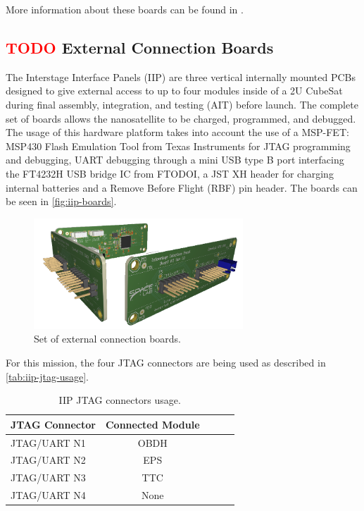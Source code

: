 More information about these boards can be found in \cite{pc104-boards}.

\subsection{ \textcolor{red}{TODO} External Connection Boards}

The Interstage Interface Panels (IIP) are three vertical internally mounted PCBs designed to give external access to up to four modules inside of a 2U CubeSat during final assembly, integration, and testing (AIT) before launch. The complete set of boards allows the nanosatellite to be charged, programmed, and debugged. The usage of this hardware platform takes into account the use of a MSP-FET: MSP430 Flash Emulation Tool from Texas Instruments for JTAG programming and debugging, UART debugging through a mini USB type B port interfacing the FT4232H USB bridge IC from FTODOI, a JST XH header for charging internal batteries and a Remove Before Flight (RBF) pin header. The boards can be seen in \autoref{fig:iip-boards}.

\begin{figure}[!ht]
    \begin{center}
        \includegraphics[width=0.7\textwidth]{figures/subsystems/iip_fullset}
        \caption{Set of external connection boards.}
        \label{fig:iip-boards}
    \end{center}
\end{figure}

For this mission, the four JTAG connectors are being used as described in \autoref{tab:iip-jtag-usage}.

\begin{table}[!h]
    \centering
    \begin{tabular}{lcccc}
        \toprule[1.5pt]
        \textbf{JTAG Connector} & \textbf{Connected Module} \\
        \midrule
        JTAG/UART N1 & OBDH \\
        JTAG/UART N2 & EPS \\
        JTAG/UART N3 & TTC \\
        JTAG/UART N4 & None \\
        \bottomrule[1.5pt]
    \end{tabular}
    \caption{IIP JTAG connectors usage.}
    \label{tab:iip-jtag-usage}
\end{table}

